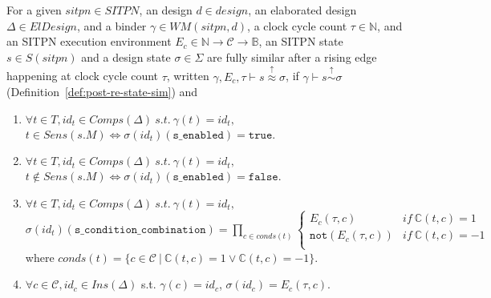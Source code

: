 \documentclass[dvipsnames,12pt]{article}
\begin{document}
\begin{definition}
  \label{def:full-post-re-state-sim}
  For a given $sitpn\in{}SITPN$, an \hvhdl{} design $d\in{}design$, an
  elaborated design $\Delta\in{}ElDesign$, and a binder
  $\gamma\in{}WM(sitpn,d)$, a clock cycle count $\tau\in\mathbb{N}$,
  and an SITPN execution environment
  $E_c\in\mathbb{N}\rightarrow\mathcal{C}\rightarrow\mathbb{B}$, an
  SITPN state $s\in{}S(sitpn)$ and a design state $\sigma\in\Sigma$
  are fully similar after a rising edge happening at clock cycle count
  $\tau$, written
  $\gamma,E_c,\tau\vdash{}s\stackrel{\uparrow}{\approx}\sigma$, if
  $\gamma\vdash{}s\stackrel{\uparrow}{\sim}\sigma$
  (Definition~\ref{def:post-re-state-sim}) and
  \begin{enumerate}
  \item $\forall{}t\in{}T,id_t\in{}Comps(\Delta)~s.t.~\gamma(t)=id_t,$
    $t\in{}Sens(s.M)\Leftrightarrow\sigma(id_t)(\texttt{s\_enabled})=\mathtt{true}$.
  \item $\forall{}t\in{}T,id_t\in{}Comps(\Delta)~s.t.~\gamma(t)=id_t,$
    $t\notin{}Sens(s.M)\Leftrightarrow\sigma(id_t)(\texttt{s\_enabled})=\mathtt{false}$.
  \item
    $\forall{}t\in{}T,id_t\in{}Comps(\Delta)~s.t.~\gamma(t)=id_t,$\\
    $\sigma(id_t)(\texttt{s\_condition\_combination})=
    \prod\limits_{c\in{}conds(t)}
    \begin{cases}
      E_c(\tau,c) & if~\mathbb{C}(t,c)=1 \\
      \mathtt{not}(E_c(\tau,c)) & if~\mathbb{C}(t,c)=-1 \\
    \end{cases}$\\
    where
    $conds(t)=\{c\in\mathcal{C}~\vert~\mathbb{C}(t,c)=1\lor\mathbb{C}(t,c)=-1\}$.
  \item $\forall{}c\in\mathcal{C},id_c\in{}Ins(\Delta)$
    s.t. $\gamma(c)=id_c$, $\sigma(id_c)=E_c(\tau,c)$.
  \end{enumerate}
\end{definition}
\end{document}
